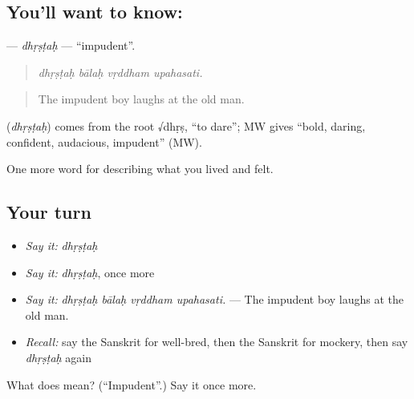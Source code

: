 \subsection*{You'll want to know: }
\textbf{} — \emph{dhṛṣṭaḥ} — \textquotedblleft{}impudent\textquotedblright{}.

\begin{quote}
   
\end{quote}

\begin{quote}
\emph{dhṛṣṭaḥ bālaḥ vṛddham upahasati.}
\end{quote}

\begin{quote}
The impudent boy laughs at the old man.
\end{quote}

\begin{cousinweb}
\textbf{} (\emph{dhṛṣṭaḥ}) comes from the root √dhṛṣ, \textquotedblleft{}to dare\textquotedblright{}; MW gives \textquotedblleft{}bold, daring, confident, audacious, impudent\textquotedblright{} (MW).
\end{cousinweb}

\begin{grammarlens}[title={What you've built}]
One more word for describing what you lived and felt.
\end{grammarlens}

\subsection*{Your turn}
\begin{itemize}
\raggedright
  \item \emph{Say it:} \emph{dhṛṣṭaḥ}
  \item \emph{Say it:} \emph{dhṛṣṭaḥ}, once more
  \item \emph{Say it:} \emph{dhṛṣṭaḥ bālaḥ vṛddham upahasati.} — The impudent boy laughs at the old man.
  \item \emph{Recall:} say the Sanskrit for well-bred, then the Sanskrit for mockery, then say \emph{dhṛṣṭaḥ} again
\end{itemize}

\begin{tcolorbox}[breakable,colback=teal!4,colframe=teal!35!black,title={Before you move on}]
What does  mean? (\textquotedblleft{}Impudent\textquotedblright{}.) Say it once more.
\end{tcolorbox}
